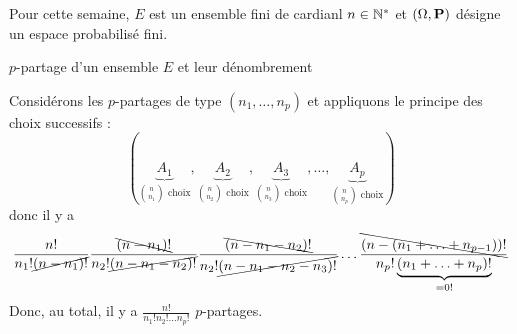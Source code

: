\documentclass{article}
\date{8 juin 2024}
\begin{document}
	\maketitle
	
	Pour cette semaine, $E$ est un ensemble fini de cardianl $n \in \mathbb N^*$ et $(\Omega, \mathbf P)$ désigne un espace probabilisé fini.
	
	\begin{question_kholle}
		[Soit $p \in \N^*$. Un $p$-partage de $E$ est un $p$-liste $(A_1, \ldots, A_p) \in \mathcal{P}(E)^p$ de parties de $E$ (éventuellement vide), deux à deux disjointes qui recouvrent $E$ c'est-à-dire \tq+* t:
		\begin{equation}
			\forall (i, j) \in \lient 1 ; p \rient,
			i \neq j \implies A_i \cap A_j = \emptyset
			\qquad \text{et} \qquad
			\bigcup_{i=1}^{p} A_i = E
		\end{equation}
		
		Soient $(n_1, \ldots n_p) \in \N^p$ \tqs $n = n_1 + \ldots + n_p$ est un $p$-partage de $E$ \tq
		\begin{equation*}
			\forall (i, j) \in \lient 1 ; p \rient, \
			\left|A_i\right| = n_i
		\end{equation*}
		Le nombre de $p$-partage de type $(n_1, \ldots, n_p)$ est :
		\begin{equation}
			\frac{n!}{\displaystyle \prod_{i=1}^{p} n_i !}
		\end{equation}
		]
		{$p$-partage d'un ensemble $E$ et leur dénombrement}
		
		Considérons les $p$-partages de type $(n_1, \ldots, n_p)$ et appliquons le principe des choix successifs :
		\begin{equation*}
			\left(
				\underbrace{A_1}_{\binom{n}{n_1} \text{ choix}},
				\underbrace{A_2}_{\binom{n}{n_2} \text{ choix}},
				\underbrace{A_3}_{\binom{n}{n_3} \text{ choix}},
				\ldots,
				\underbrace{A_p}_{\binom{n}{n_p} \text{ choix}}
			\right)
		\end{equation*}
		donc il y a
		\begin{equation*}
			\frac{ n! }{n_1! \cancel{(n-n_1)!} }
			\frac{ \bcancel{(n-n_1)!} }{n_2! \cancel{(n-n_1-n_2)!} }
			\frac{ \bcancel{(n-n_1-n_2)!} }{n_2! \cancel{(n-n_1-n_2-n_3)!} }
			\ldots
			\frac{ \bcancel{(n-(n_1+\ldots+n_{p-1}))!} }{n_p! \underbrace{(n_1+\ldots+n_p)!}_{=0!} }
		\end{equation*}
		Donc, au total, il y a $\frac{n!}{n_1! n_2! \ldots n_p!}$ $p$-partages.
	\end{question_kholle}
	
\end{document}

